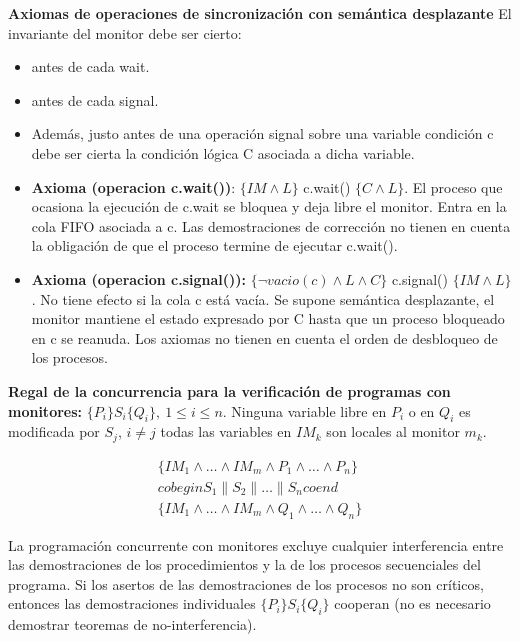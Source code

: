 \documentclass[a4paper,11pt]{article}
\begin{document}
\textbf{Axiomas de operaciones de sincronización con semántica desplazante}
El invariante del monitor debe ser cierto:
\begin{itemize}
\item antes de cada wait.
\item antes de cada signal.
\item Además, justo antes de una operación signal sobre una variable condición c debe ser cierta la condición lógica C asociada a dicha variable.
\end{itemize}

\begin{itemize}
\item \textbf{Axioma (operacion c.wait())}: $\{IM \wedge L\}$ c.wait() $\{C \wedge L\}$. El proceso que ocasiona la ejecución de c.wait se bloquea y deja libre el monitor. Entra en la cola FIFO asociada a c. Las demostraciones de corrección no tienen en cuenta la obligación de que el proceso termine de ejecutar c.wait().

\item \textbf{Axioma (operacion c.signal()):} $\{\neg vacio(c) \wedge L \wedge C\}$ c.signal() $\{IM \wedge L\}$. No tiene efecto si la cola c está vacía. Se supone semántica desplazante, el monitor mantiene el estado expresado por C hasta que un proceso bloqueado en c se reanuda. Los axiomas no tienen en cuenta el orden de desbloqueo de los procesos.
\end{itemize}

\textbf{Regal de la concurrencia para la verificación de programas con monitores:} $\{P_i\}S_i\{Q_i\}, \> 1\leq i \leq n$. Ninguna variable libre en $P_i$ o en $Q_i$ es modificada por $S_j$, $i \neq j$ todas las variables en $IM_k$ son locales al monitor $m_k$. 

\begin{align*}
\{IM_1 \wedge \ldots \wedge IM_m \wedge P_1 \wedge \ldots \wedge P_n \} \\
cobegin S_1 \parallel S_2 \parallel \ldots \parallel S_n coend \\
\{IM_1 \wedge \ldots \wedge IM_m \wedge Q_1 \wedge \ldots \wedge Q_n\}
\end{align*}

La programación concurrente con monitores excluye cualquier interferencia entre las demostraciones de los procedimientos y la de los procesos secuenciales del programa. Si los asertos de las demostraciones de los procesos no son críticos, entonces las demostraciones individuales $\{P_i\}S_i\{Q_i\}$ cooperan (no es necesario demostrar teoremas de no-interferencia). \\
\end{document}
